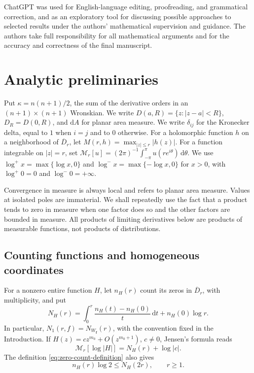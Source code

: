 \documentclass[11pt,letterpaper,reqno]{amsart}
\theoremstyle{remark}
\numberwithin{equation}{section}
\newcommand{\mean}[2]{\mathcal M_{#1}\!\left[#2\right]}
\newcommand{\fv}{\bm f}
\begin{document}
ChatGPT was used for English-language editing, proofreading, and grammatical
correction, and as an exploratory tool for discussing possible approaches to
selected results under the authors' mathematical supervision and guidance.
The authors take full responsibility for all mathematical arguments and for
the accuracy and correctness of the final manuscript.


\section{Analytic preliminaries}\label{sec:analytic}

Put $\kappa=n(n+1)/2$, the sum of the derivative orders in an
$(n+1)\times(n+1)$ Wronskian. We write
$D(a,R)=\{z:|z-a|<R\}$, $D_R=D(0,R)$, and $\mathrm dA$ for planar area
measure. We write $\delta_{ij}$ for the Kronecker delta, equal to $1$
when $i=j$ and to $0$ otherwise. For a holomorphic function $h$ on a neighborhood of $\overline D_r$,
let $M(r,h)=\max_{|z|\le r}|h(z)|$. For a function integrable on $|z|=r$, set
$\mean r u=(2\pi)^{-1}\int_{-\pi}^{\pi}u(re^{i\theta})\,\mathrm d\theta$.
We use $\log^+x=\max\{\log x,0\}$ and
$\log^-x=\max\{-\log x,0\}$ for $x>0$, with
$\log^+0=0$ and $\log^-0=+\infty$.

Convergence in measure is always local and refers to planar area measure.
Values at isolated poles are immaterial. We shall repeatedly use the fact
that a product tends to zero in measure when one factor does so and the
other factors are bounded in measure. All products of limiting derivatives
below are products of measurable functions, not products of distributions.

\subsection{Counting functions and homogeneous coordinates}

For a nonzero entire function $H$, let $n_H(r)$ count its zeros in
$\overline D_r$, with multiplicity, and put
\begin{equation}\label{eq:zero-count-definition}
 N_H(r)=\int_0^r\frac{n_H(t)-n_H(0)}t\,\mathrm dt+n_H(0)\log r.
\end{equation}
In particular, $N_1(r,f)=N_{W_{\fv}}(r)$, with the convention fixed in the
Introduction. If $H(z)=cz^{m_0}+O(z^{m_0+1})$, $c\ne0$, Jensen's formula reads
\begin{equation}\label{eq:zerojensen}
 \mean r{\log|H|}=N_H(r)+\log|c|.
\end{equation}
The definition \eqref{eq:zero-count-definition} also gives
\begin{equation}\label{eq:countbound}
 n_H(r)\log2\le N_H(2r),\qquad r\ge1.
\end{equation}
\end{document}

